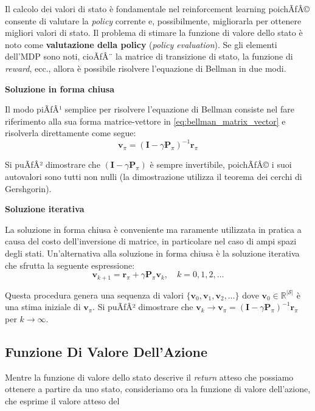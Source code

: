 ﻿\documentclass[11pt, a4paper]{report}
\begin{document}
Il calcolo dei valori di stato è fondamentale nel reinforcement learning poichÃƒÂ© consente di valutare la \emph{policy} corrente e, possibilmente, migliorarla per ottenere migliori valori di stato. Il problema di stimare la funzione di valore dello stato è noto come \textbf{valutazione della policy} (\emph{policy evaluation}). Se gli elementi dell'MDP sono noti, cioÃƒÂ¨ la matrice di transizione di stato, la funzione di \emph{reward}, ecc., allora è possibile risolvere l'equazione di Bellman in due modi.

\textbf{Soluzione in forma chiusa}

Il modo piÃƒÂ¹ semplice per risolvere l'equazione di Bellman consiste nel fare riferimento alla sua forma matrice-vettore in \eqref{eq:bellman_matrix_vector} e risolverla direttamente come segue:
\begin{equation}
\bm{v}_\pi = (\bm{I} - \gamma \bm{P}_\pi)^{-1} \bm{r}_\pi
\end{equation}

Si puÃƒÂ² dimostrare che $(\bm{I} - \gamma \bm{P}_\pi)$ è sempre invertibile, poichÃƒÂ© i suoi autovalori sono tutti non nulli (la dimostrazione utilizza il teorema dei cerchi di Gershgorin).

\textbf{Soluzione iterativa}

La soluzione in forma chiusa è conveniente ma raramente utilizzata in pratica a causa del costo dell'inversione di matrice, in particolare nel caso di ampi spazi degli stati. Un'alternativa alla soluzione in forma chiusa è la soluzione iterativa che sfrutta la seguente espressione:
\begin{equation}
\bm{v}_{k+1} = \bm{r}_\pi + \gamma \bm{P}_\pi \bm{v}_k, \quad k = 0, 1, 2, \dots
\end{equation}

Questa procedura genera una sequenza di valori $\{\bm{v}_0, \bm{v}_1, \bm{v}_2, \dots\}$ dove $\bm{v}_0 \in \mathbb{R}^{|\mathcal{S}|}$ è una stima iniziale di $\bm{v}_\pi$. Si puÃƒÂ² dimostrare che $\bm{v}_k \to \bm{v}_\pi = (\bm{I} - \gamma \bm{P}_\pi)^{-1} \bm{r}_\pi$ per $k \to \infty$.

\subsection{Funzione Di Valore Dell'Azione}

Mentre la funzione di valore dello stato descrive il \emph{return} atteso che possiamo ottenere a partire da uno stato, consideriamo ora la funzione di valore dell'azione, che esprime il valore atteso del
\end{document}

